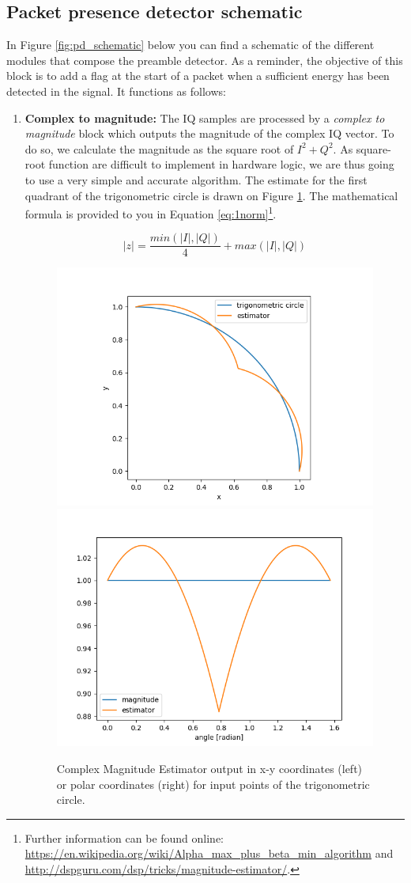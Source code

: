 \subsection{Packet presence detector schematic}
In Figure \ref{fig:pd_schematic} below you can find a schematic of the different modules that compose the preamble detector. As a reminder, the objective of this block is to add a flag at the start of a packet when a sufficient energy has been detected in the signal. It functions as follows:
\begin{enumerate}
    \item \textbf{Complex to magnitude: } The IQ samples are processed by a \textit{complex to magnitude} block which outputs the magnitude of the complex IQ vector.
    To do so, we calculate the magnitude as the square root of $I^2+Q^2$. As square-root function are difficult to implement in hardware logic, we are thus going to use a very simple and accurate algorithm. The estimate for the first quadrant of the trigonometric circle is drawn on Figure \ref{fig:cmplx2mag}. The mathematical formula is provided to you in Equation \ref{eq:1norm}\footnote{Further information can be found online: \url{https://en.wikipedia.org/wiki/Alpha_max_plus_beta_min_algorithm} and \url{http://dspguru.com/dsp/tricks/magnitude-estimator/}.}.

    \begin{equation}
        |z| = \frac{min(|I|,|Q|)}{4} + max(|I|,|Q|)
        \label{eq:1norm}
    \end{equation}
    
    \begin{figure}[h]
        \centering
        \includegraphics[width=0.45\linewidth]{figures/trigo.png}
        \includegraphics[width=0.45\linewidth]{figures/angle.png}
        \caption{Complex Magnitude Estimator output in x-y coordinates (left) or polar coordinates (right) for input points of the trigonometric circle.}
        \label{fig:cmplx2mag}
    \end{figure}


\end{enumerate}
